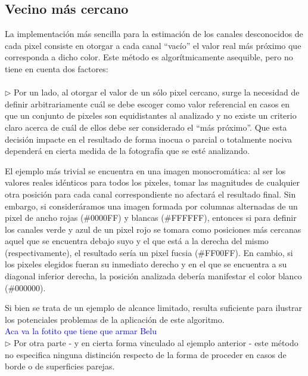 \documentclass[a4paper]{article}
\begin{document}
\subsection{Vecino m\'as cercano}
La implementación más sencilla para la estimación de los canales desconocidos de cada pixel consiste en otorgar a cada canal ``vacío'' el valor real m\'as pr\'oximo que corresponda a dicho color. Este m\'etodo es algor\'itmicamente asequible, pero no tiene en cuenta dos factores: \\
\\

$\triangleright$ Por un lado, al otorgar el valor de un sólo pixel cercano, surge la necesidad de definir arbitrariamente cuál se debe escoger como valor referencial en casos en que un conjunto de pixeles son equidistantes al analizado y no existe un criterio claro acerca de cuál de ellos debe ser considerado el ``más próximo''. Que esta decisión impacte en el resultado de forma inocua o parcial o totalmente nociva dependerá en cierta medida de la fotografía que se esté analizando.

El ejemplo más trivial se encuentra en una imagen monocromática: al ser los valores reales idénticos para todos los pixeles, tomar las magnitudes de cualquier otra posición para cada canal correspondiente no afectará el resultado final. Sin embargo, si consideráramos una imagen formada por columnas alternadas de un pixel de ancho rojas (\#0000FF) y blancas (\#FFFFFF), entonces si para definir los canales verde y azul de un pixel rojo se tomara como posiciones más cercanas aquel que se encuentra debajo suyo y el que está a la derecha del mismo (respectivamente), el resultado sería un pixel fucsia (\#FF00FF). En cambio, si los pixeles elegidos fueran su inmediato derecho y en el que se encuentra a su diagonal inferior derecha, la posición analizada debería manifestar el color blanco (\#000000).

Si bien se trata de un ejemplo de alcance limitado, resulta suficiente para ilustrar los potenciales problemas de la aplicación de este algoritmo.\\

\textcolor{blue}{Aca va la fotito que tiene que armar Belu}\\

$\triangleright$ Por otra parte - y en cierta forma vinculado al ejemplo anterior - este método no especifica ninguna distinción respecto de la forma de proceder en casos de borde o de superficies parejas. \\
\end{document}
